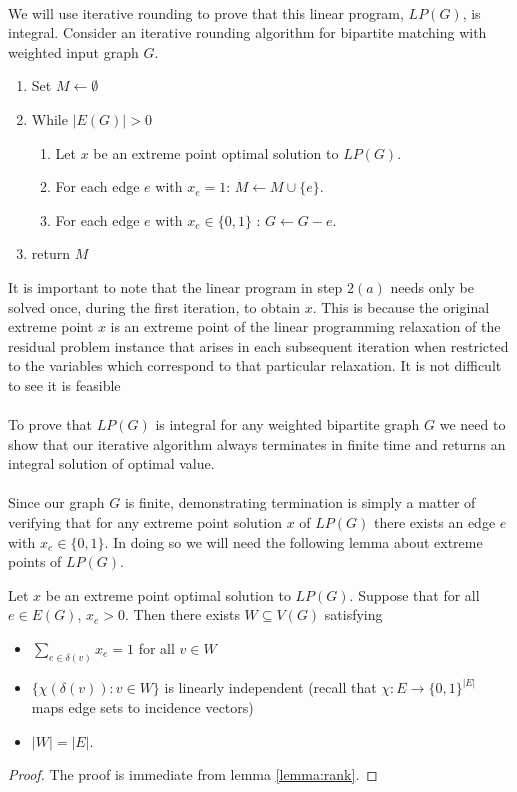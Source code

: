 \paragraph{}
We will use iterative rounding to prove that this linear program, $LP(G)$, is integral. Consider an iterative rounding algorithm for bipartite matching with weighted input graph $G$.
\begin{enumerate}
\item Set $M \leftarrow \emptyset$
\item While $|E(G)| > 0$\begin{enumerate}
\item Let $x$ be an extreme point optimal solution to $LP(G)$.
\item For each edge $e$ with $x_e = 1$: $M \leftarrow M \cup \{e\}$.
\item For each edge $e$ with $x_e \in \{0,1\}$ : $G \leftarrow G - e$.
\end{enumerate}
\item return $M$
\end{enumerate}
It is important to note that the linear program in step $2(a)$ needs only be solved once, during the first iteration, to obtain $x$. This is because the original extreme point $x$ is an extreme point of the linear programming relaxation of the residual problem instance that arises in each subsequent iteration when restricted to the variables which correspond to that particular relaxation. It is not difficult to see it is feasible
\paragraph{}
To prove that $LP(G)$ is integral for any weighted bipartite graph $G$ we need to show that our iterative algorithm always terminates in finite time and returns an integral solution of optimal value.
\paragraph{} Since our graph $G$ is finite, demonstrating termination is simply a matter of verifying that for any extreme point solution $x$ of $LP(G)$ there exists an edge $e$ with $x_e \in \{0,1\}$. In doing so we will need the following lemma about extreme points of $LP(G)$.
\begin{lemma} Let $x$ be an extreme point optimal solution to $LP(G)$. Suppose that for all $e \in E(G)$, $x_e > 0$. Then there exists $W \subseteq V(G)$ satisfying
\begin{itemize}
\item $\sum_{e\in\delta(v)} x_e = 1$ for all $v \in W$ \\
\item $\{\chi(\delta(v)) : v \in W\}$ is linearly independent (recall that $\chi : E \rightarrow \{0,1\}^{|E|}$ maps edge sets to incidence vectors)
\item $|W| = |E|$.
\end{itemize} 
\end{lemma}
\begin{proof}
The proof is immediate from lemma \ref{lemma:rank}.
\end{proof}
